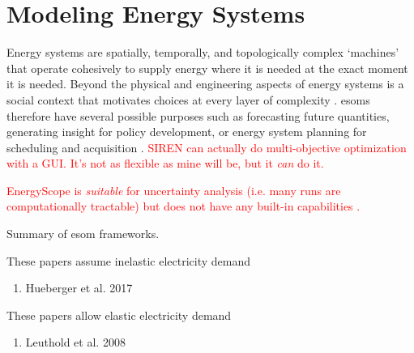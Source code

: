 \section{Modeling Energy Systems}

Energy systems are spatially, temporally, and topologically complex ‘machines’
that operate cohesively to supply energy where it is needed at the exact moment
it is needed. Beyond the physical and engineering aspects of energy systems is a 
social context that motivates choices at every layer of complexity 
\cite{dotson_influence_2022}. \Acfp{esom} therefore have several possible purposes such as forecasting future quantities, generating insight for policy development, or energy system planning for scheduling and acquisition \cite{decarolis_using_2011, yue_review_2018}.
\textcolor{red}{SIREN \cite{sustainable_energy_now_renewable_2016} can actually do multi-objective optimization with a GUI. It's not as flexible as mine will be, but it \textit{can} do it.}

\textcolor{red}{EnergyScope is \textit{suitable} for uncertainty analysis (i.e. many runs are computationally tractable) but does not have any built-in capabilities \cite{limpens_energyscope_2019}.}

\begin{table}
    \centering
    \caption{Summary of \ac{esom} frameworks.}
    \label{tab:esoms}
    \resizebox*{\textwidth}{0.95\textheight}{}
\end{table}



These papers assume inelastic electricity demand
\begin{enumerate}
    \item Hueberger et al. 2017 \cite{heuberger_power_2017}
\end{enumerate}

These papers allow elastic electricity demand
\begin{enumerate}
    \item Leuthold et al. 2008 \cite{leuthold_elmod_2008}
\end{enumerate}

